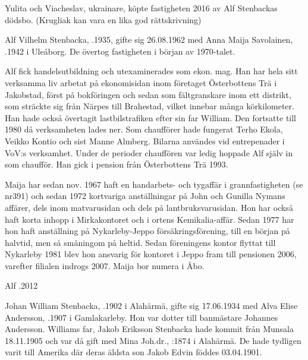 Yulita och Viacheslav, ukrainare, köpte fastigheten 2016 av Alf Stenbackas dödsbo. (Krugliak kan vara en lika god rättskrivning)


Alf Vilhelm Stenbacka, .1935, gifte sig 26.08.1962 med Anna Maija Savolainen, .1942 i Uleåborg. De övertog fastigheten i början av 1970-talet.



Alf fick handelsutbildning och utexaminerades som ekon. mag. Han har hela sitt verksamma liv arbetat på ekonomisidan inom företaget Österbottens Trä i Jakobstad, först på bokföringen och sedan som fältgranskare inom ett distrikt, som sträckte sig från Närpes till Brahestad, vilket innebar många körkilometer. Han hade också övertagit lastbilstrafiken efter sin far William. Den fortsatte till 1980 då verksamheten lades ner. Som chaufförer hade fungerat Terho Ekola, Veikko Kontio och sist Manne Almberg. Bilarna användes vid entrepenader i VoV:s verksamhet. Under de perioder chauffören var ledig hoppade Alf själv in som chaufför. Han gick i pension från Österbottens Trä 1993.

Maija har sedan nov. 1967 haft en handarbets- och tygaffär i grannfastigheten (se nr391) och sedan 1972 kortvariga anställningar på John och Gunilla Nymans affärer, dels inom matvarusidan och dels på lantbruksvarusidan. Hon har också haft korta inhopp i Mirkakontoret och i ortens Kemikalia-affär. Sedan 1977 har hon  haft anställning på Nykarleby-Jeppo försäkringsförening, till en början på halvtid, men så småningom på heltid. Sedan föreningens kontor flyttat till Nykarleby 1981 blev hon ansvarig för kontoret i Jeppo fram till pensionen 2006, varefter filialen indrogs 2007. Maija bor numera i Åbo.
\begin{jhchildren}
  \item {}
  \item {}
\end{jhchildren}

Alf .2012


Johan William Stenbacka, .1902 i Alahärmä, gifte sig 17.06.1934 med Alva Elise Andersson, .1907 i Gamlakarleby. Hon var dotter till banmästare Johannes Andersson. Williams far, Jakob Eriksson Stenbacka hade kommit från Munsala 18.11.1905 och var då gift med Mina Joh.dr., :1874 i Alahärmä. De hade tydligen varit till Amerika där deras äldsta son Jakob Edvin föddes 03.04.1901.

